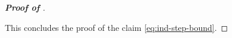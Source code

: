 \begin{proof}[\bf Proof of ]
\begin{enumerate}
\end{enumerate}
This concludes the proof of the claim \eqref{eq:ind-step-bound}. 



\end{proof}
